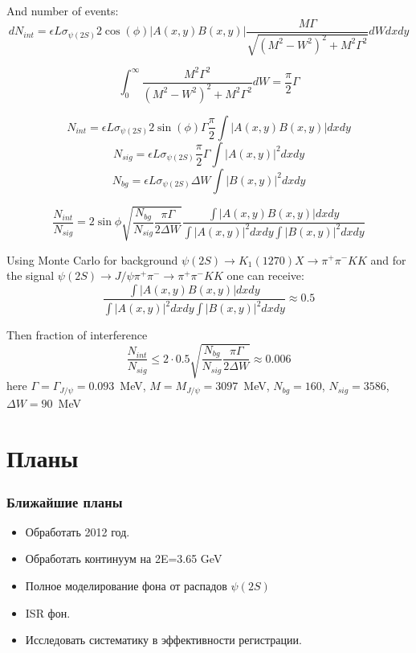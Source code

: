 \documentclass[unicode]{beamer}
\newcommand{\pipi}{\pi^{+}\pi^{-}}
\begin{document}
\begin{frame}
	\tiny
And number of events:
\begin{equation}
  dN_{int} = \epsilon L \sigma_{\psi(2S)} 2\cos(\phi)|A(x,y) B (x,y)|\frac{M \Gamma}{\sqrt{(M^2-W^2)^2 + M^2\Gamma^2}} dW dx dy
\end{equation}


\begin{equation}
  \int_{0}^{\infty}\frac{M^2 \Gamma^2}{(M^2-W^2)^2 + M^2\Gamma^2} dW = \frac{\pi}{2} \Gamma
\end{equation}


\begin{equation}
N_{int} = \epsilon L \sigma_{\psi(2S)} 2\sin(\phi) \Gamma \frac{\pi}{2}\int |A(x,y) B (x,y)|dxdy
\end{equation}
\begin{equation}
  N_{sig} = \epsilon L \sigma_{\psi(2S)} \frac{\pi}{2} \Gamma \int |A(x,y)|^2 dxdy
\end{equation}
\begin{equation}
  N_{bg} = \epsilon L \sigma_{\psi(2S)} \Delta W \int |B(x,y)|^2 dxdy
\end{equation}

\begin{equation}
  \frac{N_{int}}{N_{sig}} = 2\sin\phi
  \sqrt{\frac{N_{bg}}{N_{sig}}\frac{\pi \Gamma}{2 \Delta W}} 
  \frac{\int |A(x,y) B (x,y)|dxdy}{\int |A(x,y)|^2 dxdy\int |B(x,y)|^2 dxdy}
\end{equation}
\end{frame}

\begin{frame}
	\small
Using Monte Carlo for background $\psi(2S) \to K_1(1270) X \to \pipi KK $ and for the signal $\psi(2S) \to J/\psi\pipi \to \pipi KK $ one can receive:
\begin{equation}
  \frac{\int |A(x,y) B (x,y)|dxdy}{\int |A(x,y)|^2 dxdy\int |B(x,y)|^2 dxdy} \approx 0.5
\end{equation}

Then fraction of interference
\begin{equation}
  \frac{N_{int}}{N_{sig}} \le 2 \cdot 0.5 
    \sqrt{\frac{N_{bg}}{N_{sig}}\frac{\pi \Gamma}{2 \Delta W}}   \approx 0.006
\end{equation}
here $\Gamma = \Gamma_{J/\psi} = 0.093$~MeV, $M= M_{J/\psi}=3097$~MeV, $N_{bg}=160$, $N_{sig} = 3586$, $\Delta W = 90$~MeV 
\end{frame}



\section{Планы}

\begin{frame}
	\frametitle{Ближайшие планы}
	\begin{itemize}
		\item Обработать 2012 год.
		\item Обработать континуум на 2E=3.65 GeV
		\item Полное моделирование фона от распадов $\psi(2S)$
		\item ISR фон.
		\item Исследовать систематику в эффективности регистрации.
	\end{itemize}
\end{frame}
\end{document}

